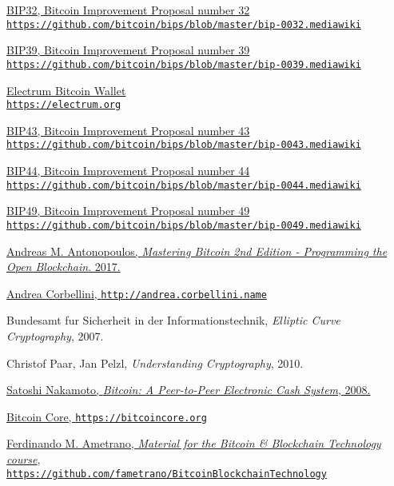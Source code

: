 \documentclass[
11pt, %
oneside, %
english, %
singlespacing, %
toctotoc, %
headsepline, %
]{MastersDoctoralThesis} %
\begin{document}
	\begin{thebibliography}{13}
		\href{https://github.com/bitcoin/bips/blob/master/bip-0032.mediawiki}{BIP32, Bitcoin Improvement Proposal number 32 \\ \texttt{https://github.com/bitcoin/bips/blob/master/bip-0032.mediawiki}}
		
		\href{https://github.com/bitcoin/bips/blob/master/bip-0039.mediawiki}{BIP39, Bitcoin Improvement Proposal number 39 \\ \texttt{https://github.com/bitcoin/bips/blob/master/bip-0039.mediawiki}}
		
		
		\href{https://electrum.org}{Electrum Bitcoin Wallet \\ \texttt{https://electrum.org}}
		
		\href{https://github.com/bitcoin/bips/blob/master/bip-0043.mediawiki}{BIP43, Bitcoin Improvement Proposal number 43 \\ \texttt{https://github.com/bitcoin/bips/blob/master/bip-0043.mediawiki}}

		\href{https://github.com/bitcoin/bips/blob/master/bip-0044.mediawiki}{BIP44, Bitcoin Improvement Proposal number 44 \\ \texttt{https://github.com/bitcoin/bips/blob/master/bip-0044.mediawiki}}
		
		\href{https://github.com/bitcoin/bips/blob/master/bip-0049.mediawiki}{BIP49, Bitcoin Improvement Proposal number 49 \\ \texttt{https://github.com/bitcoin/bips/blob/master/bip-0049.mediawiki}}
		
		\href{https://github.com/bitcoinbook/bitcoinbook}{Andreas M. Antonopoulos, \textit{Mastering Bitcoin 2nd Edition - Programming the Open Blockchain}. 2017.}
		
		\href{http://andrea.corbellini.name}{Andrea Corbellini, \texttt{http://andrea.corbellini.name}}
		
		Bundesamt fur Sicherheit in der Informationstechnik, \textit{Elliptic Curve Cryptography}, 2007.
		
		Christof Paar, Jan Pelzl, \textit{Understanding Cryptography}, 2010.
		
		\href{https://bitcoin.org/bitcoin.pdf}{Satoshi Nakamoto, \textit{Bitcoin: A Peer-to-Peer Electronic Cash System}, 2008.}
		
		\href{https://bitcoincore.org}{Bitcoin Core, \texttt{https://bitcoincore.org}}
		
		\href{https://github.com/fametrano/BitcoinBlockchainTechnology}{Ferdinando M. Ametrano, \textit{Material for the Bitcoin \& Blockchain Technology course}, \\ \texttt{https://github.com/fametrano/BitcoinBlockchainTechnology}}
		

	\end{thebibliography}

%
%
	
	\printbibliography[heading=bibintoc]
	
	
\end{document}
